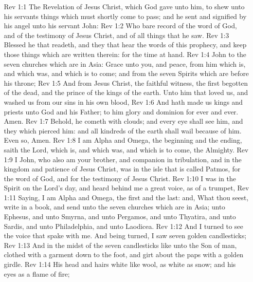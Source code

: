 \vs Rev 1:1 The Revelation of Jesus Christ, which God gave unto him, to shew unto his servants things which must shortly come to pass; and he sent and signified  by his angel unto his servant John:
\vs Rev 1:2 Who bare record of the word of God, and of the testimony of Jesus Christ, and of all things that he saw.
\vs Rev 1:3 Blessed  he that readeth, and they that hear the words of this prophecy, and keep those things which are written therein: for the time  at hand.
\vs Rev 1:4 John to the seven churches which are in Asia: Grace  unto you, and peace, from him which is, and which was, and which is to come; and from the seven Spirits which are before his throne;
\vs Rev 1:5 And from Jesus Christ,  the faithful witness,  the first begotten of the dead, and the prince of the kings of the earth. Unto him that loved us, and washed us from our sins in his own blood,
\vs Rev 1:6 And hath made us kings and priests unto God and his Father; to him  glory and dominion for ever and ever. Amen.
\vs Rev 1:7 Behold, he cometh with clouds; and every eye shall see him, and they  which pierced him: and all kindreds of the earth shall wail because of him. Even so, Amen.
\vs Rev 1:8 I am Alpha and Omega, the beginning and the ending, saith the Lord, which is, and which was, and which is to come, the Almighty.
\vs Rev 1:9 I John, who also am your brother, and companion in tribulation, and in the kingdom and patience of Jesus Christ, was in the isle that is called Patmos, for the word of God, and for the testimony of Jesus Christ.
\vs Rev 1:10 I was in the Spirit on the Lord's day, and heard behind me a great voice, as of a trumpet,
\vs Rev 1:11 Saying, I am Alpha and Omega, the first and the last: and, What thou seest, write in a book, and send  unto the seven churches which are in Asia; unto Ephesus, and unto Smyrna, and unto Pergamos, and unto Thyatira, and unto Sardis, and unto Philadelphia, and unto Laodicea.
\vs Rev 1:12 And I turned to see the voice that spake with me. And being turned, I saw seven golden candlesticks;
\vs Rev 1:13 And in the midst of the seven candlesticks  like unto the Son of man, clothed with a garment down to the foot, and girt about the paps with a golden girdle.
\vs Rev 1:14 His head and  hairs  white like wool, as white as snow; and his eyes  as a flame of fire;
